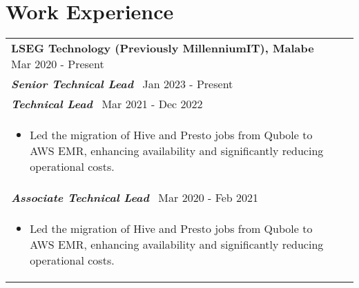 \documentclass[a4paper,8pt]{article}
\begin{document}
\section{Work Experience}
\begin{tabularx}{\linewidth}{ @{}l r@{} }
  \textbf{{LSEG Technology (Previously MillenniumIT), Malabe}} \hfill \color[HTML]{371e77} Mar 2020 - Present \\[4pt]
  
  \color[HTML]{371e77}\textbf{\textit{Senior Technical Lead}}\ \hfill \color[HTML]{4B28A4} Jan 2023 - Present \\[5pt]
  
  \color[HTML]{371e77}\textbf{\textit{Technical Lead}}\ \hfill \color[HTML]{4B28A4} Mar 2021 - Dec 2022 \\[5pt]
  \begin{minipage}[t]{\linewidth}
      \begin{itemize}[nosep,after=\strut, leftmargin=2em, itemsep=2pt]
          \item Led the migration of Hive and Presto jobs from Qubole to AWS EMR, enhancing availability and significantly reducing operational costs.
      \end{itemize}
  \end{minipage} \\[10pt]
  
  \color[HTML]{371e77}\textbf{\textit{Associate Technical Lead}}\ \hfill \color[HTML]{4B28A4} Mar 2020 - Feb 2021 \\[5pt]
  \begin{minipage}[t]{\linewidth}
      \begin{itemize}[nosep,after=\strut, leftmargin=2em, itemsep=2pt]
          \item Led the migration of Hive and Presto jobs from Qubole to AWS EMR, enhancing availability and significantly reducing operational costs.
      \end{itemize}
  \end{minipage}
  \end{tabularx}
\end{document}
